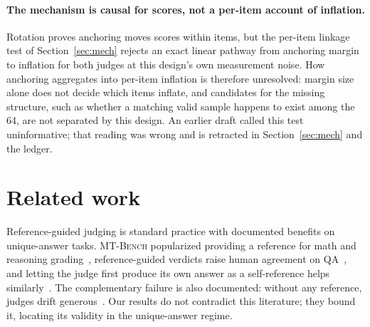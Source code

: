\documentclass[11pt]{article}
\begin{document}
\paragraph{The mechanism is causal for scores, not a per-item account of inflation.}
Rotation proves anchoring moves scores within items, but the per-item linkage test of Section~\ref{sec:mech} rejects an exact linear pathway from anchoring margin to inflation for both judges at this design's own measurement noise.
How anchoring aggregates into per-item inflation is therefore unresolved: margin size alone does not decide which items inflate, and candidates for the missing structure, such as whether a matching valid sample happens to exist among the 64, are not separated by this design.
An earlier draft called this test uninformative; that reading was wrong and is retracted in Section~\ref{sec:mech} and the ledger.

\section{Related work}

Reference-guided judging is standard practice with documented benefits on unique-answer tasks.
\textsc{MT-Bench} popularized providing a reference for math and reasoning grading~\cite{zheng2023judging}, reference-guided verdicts raise human agreement on QA~\cite{refguided2024}, and letting the judge first produce its own answer as a self-reference helps similarly~\cite{dobefore2025}.
The complementary failure is also documented: without any reference, judges drift generous~\cite{generous2026}.
Our results do not contradict this literature; they bound it, locating its validity in the unique-answer regime.
\end{document}
